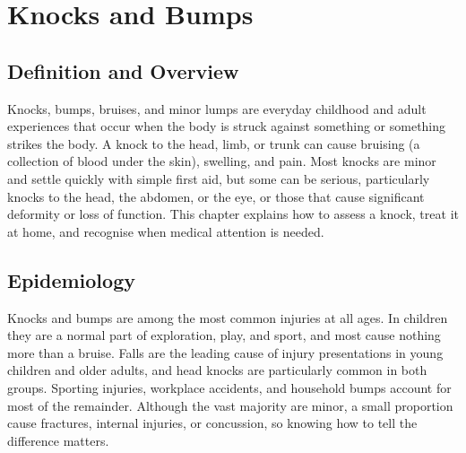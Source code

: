 \chapter{Knocks and Bumps}

\section*{Definition and Overview}
Knocks, bumps, bruises, and minor lumps are everyday childhood and adult experiences that occur when the body is struck against something or something strikes the body. A knock to the head, limb, or trunk can cause bruising (a collection of blood under the skin), swelling, and pain. Most knocks are minor and settle quickly with simple first aid, but some can be serious, particularly knocks to the head, the abdomen, or the eye, or those that cause significant deformity or loss of function. This chapter explains how to assess a knock, treat it at home, and recognise when medical attention is needed.

\section*{Epidemiology}
Knocks and bumps are among the most common injuries at all ages. In children they are a normal part of exploration, play, and sport, and most cause nothing more than a bruise. Falls are the leading cause of injury presentations in young children and older adults, and head knocks are particularly common in both groups. Sporting injuries, workplace accidents, and household bumps account for most of the remainder. Although the vast majority are minor, a small proportion cause fractures, internal injuries, or concussion, so knowing how to tell the difference matters.

